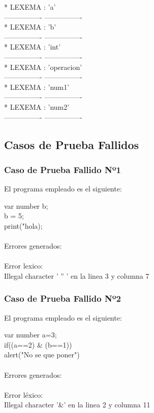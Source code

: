 \documentclass{article}
\begin{document}
\begin{flushleft}
*	LEXEMA : 'a'\\
---------------- ----------------\\

*	LEXEMA : 'b'\\
---------------- ----------------\\

*	LEXEMA : 'int'\\
---------------- ----------------\\

*	LEXEMA : 'operacion'\\
---------------- ----------------\\

*	LEXEMA : 'num1'\\
---------------- ----------------\\

*	LEXEMA : 'num2'\\
---------------- ----------------\\
\end{flushleft}
\clearpage
\subsection{Casos de Prueba Fallidos}
\subsubsection{Caso de Prueba Fallido Nº1}
\begin{center} 
El programa empleado es el siguiente:
\end{center}
\begin{flushleft}
var number b;\\
b = 5;\\
print("hola);\\
\quad\\
Errores generados:\\
\quad\\
Error lexico: \\
	\qquad Illegal character ' '' ' en la linea 3 y columna 7
\end{flushleft}

\subsubsection{Caso de Prueba Fallido Nº2}
\begin{center} 
El programa empleado es el siguiente:
\end{center}
\begin{flushleft}
var number a=3;\\
if((a==2) \& (b==1))\\
alert("No se que poner")\\
\quad\\
Errores generados:\\
\quad\\
Error léxico: \\
\qquad Illegal character '\&' en la linea 2 y columna 11
\end{flushleft}
\end{document}
